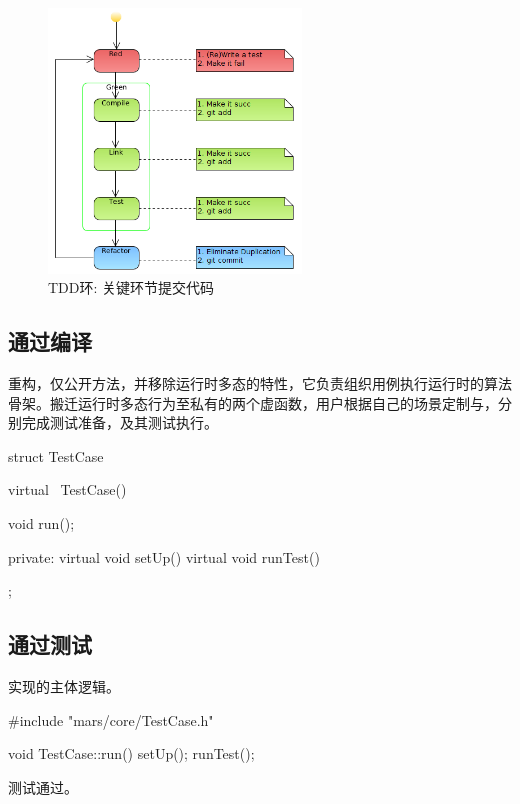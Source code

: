 \begin{content}
\begin{story}
\begin{content}
\begin{figure}[H]
\centering
\includegraphics[width=0.6\textwidth]{figures/xunit/tdd-git.png}
\caption{TDD环: 关键环节提交代码}
 \label{fig:tdd-git}
\end{figure}

\end{content}

\end{story}

\subsection{通过编译}

重构，仅公开方法，并移除运行时多态的特性，它负责组织用例执行运行时的算法骨架。搬迁运行时多态行为至私有的两个虚函数，用户根据自己的场景定制与，分别完成测试准备，及其测试执行。

\begin{leftbar}
 \begin{c++}[caption={\ttfamily{include/mars/core/TestCase.h}}]
struct TestCase {
  virtual ~TestCase() {}

  void run();

private:
  virtual void setUp() {}
  virtual void runTest() {}
};
  \end{c++}
\end{leftbar}

\subsection{通过测试}

实现的主体逻辑。

\begin{leftbar}
 \begin{c++}[caption={\ttfamily{src/mars/core/TestCase.cc}}]
#include "mars/core/TestCase.h"

void TestCase::run() {
  setUp();
  runTest();
}
 \end{c++}
\end{leftbar}

测试通过。

\end{content}

